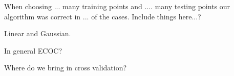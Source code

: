 \documentclass[12pt, a4paper, openany, bibliography=totoc]{report} %
\theoremstyle{definition}
\numberwithin{equation}{chapter}
\begin{document}
When choosing ... many training points and .... many testing points our algorithm was correct in ... of the cases. Include things here...?

Linear and Gaussian.

In general ECOC?

Where do we bring in cross validation?





  

%  
\end{document}
